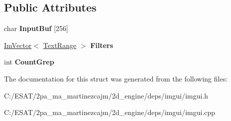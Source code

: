 \subsection*{Public Attributes}
\begin{DoxyCompactItemize}
\item 
\mbox{\label{struct_im_gui_text_filter_ad070acb1038199dd4e8f5d010c5cb5ba}} 
char {\bfseries Input\+Buf} \mbox{[}256\mbox{]}
\item 
\mbox{\label{struct_im_gui_text_filter_a5a930a339a9384e6bfadfa56a7c111fd}} 
\hyperlink{class_im_vector}{Im\+Vector}$<$ \hyperlink{struct_im_gui_text_filter_1_1_text_range}{Text\+Range} $>$ {\bfseries Filters}
\item 
\mbox{\label{struct_im_gui_text_filter_ac31839c319fe4211c21fc143b7249f86}} 
int {\bfseries Count\+Grep}
\end{DoxyCompactItemize}


The documentation for this struct was generated from the following files\+:\begin{DoxyCompactItemize}
\item 
C\+:/\+E\+S\+A\+T/2pa\+\_\+ma\+\_\+martinezcajm/2d\+\_\+engine/deps/imgui/imgui.\+h\item 
C\+:/\+E\+S\+A\+T/2pa\+\_\+ma\+\_\+martinezcajm/2d\+\_\+engine/deps/imgui/imgui.\+cpp\end{DoxyCompactItemize}
